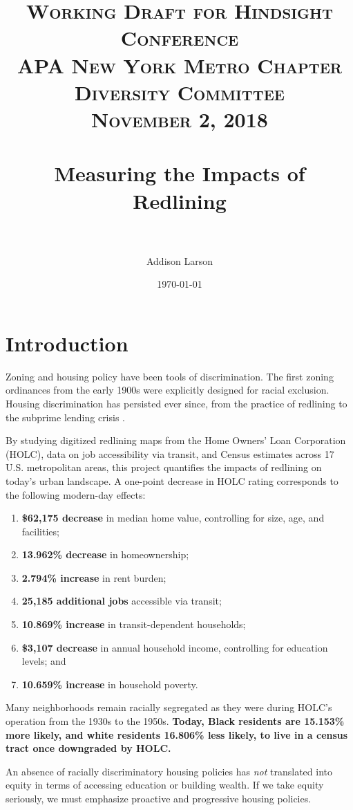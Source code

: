 \documentclass[paper=letter, fontsize=12pt]{scrartcl} %
\title{	
\normalfont \normalsize 
\textsc{Working Draft for Hindsight Conference\\APA New York Metro Chapter Diversity Committee\\November 2, 2018} \\ [6pt] %
\horrule{1pt} \\[0.5cm] %
\huge Measuring the Impacts of Redlining\\%
\horrule{1pt}\\[0.5cm] %
}
\author{Addison Larson} %
\date{\normalsize{\today}} %
\begin{document}
\maketitle %
\newpage
\tableofcontents
\newcommand{\blankpage}{
	\newpage
	\mbox{}
	\newpage
}
\listoftables
\blankpage
\section{Introduction}
Zoning and housing policy have been tools of discrimination. The first zoning ordinances from the early 1900s were explicitly designed for racial exclusion. Housing discrimination has persisted ever since, from the practice of redlining to the subprime lending crisis \cite{rothstein}.\par
By studying digitized redlining maps from the Home Owners' Loan Corporation (HOLC), data on job accessibility via transit, and Census estimates across 17 U.S. metropolitan areas, this project quantifies the impacts of redlining on today's urban landscape. A one-point decrease in HOLC rating corresponds to the following modern-day effects: 
\begin{enumerate}
	\item \textbf{\$62,175 decrease} in median home value, controlling for size, age, and facilities;
	\item \textbf{13.962\% decrease} in homeownership;
	\item \textbf{2.794\% increase} in rent burden;
	\item \textbf{25,185 additional jobs} accessible via transit;
	\item \textbf{10.869\% increase} in transit-dependent households;
	\item \textbf{\$3,107 decrease} in annual household income, controlling for education levels; and
	\item \textbf{10.659\% increase} in household poverty.
\end{enumerate}
Many neighborhoods remain racially segregated as they were during HOLC's operation from the 1930s to the 1950s. \textbf{Today, Black residents are 15.153\% more likely, and white residents 16.806\% less likely, to live in a census tract once downgraded by HOLC.}

An absence of racially discriminatory housing policies has \textit{not} translated into equity in terms of accessing education or building wealth. If we take equity seriously, we must emphasize proactive and progressive housing policies. 
\end{document}
